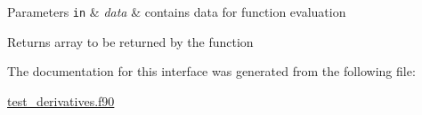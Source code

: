 \begin{DoxyParams}[1]{Parameters}
\mbox{\tt in}  & {\em data} & contains data for function evaluation\\
\hline
\end{DoxyParams}
\begin{DoxyReturn}{Returns}
array to be returned by the function 
\end{DoxyReturn}


The documentation for this interface was generated from the following file\+:\begin{DoxyCompactItemize}
\item 
\hyperlink{test__derivatives_8f90}{test\+\_\+derivatives.\+f90}\end{DoxyCompactItemize}
